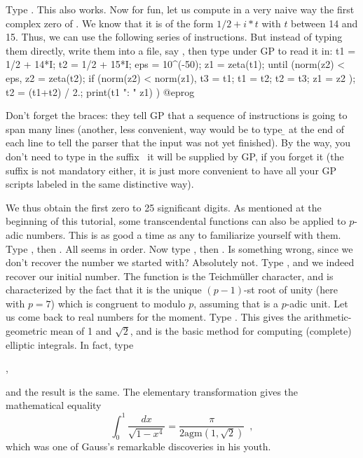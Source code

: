 Type . This also works. Now for fun, let us compute in a
very naive way the first complex zero of . We know that it is
of the form $1/2 + i*t$ with $t$ between 14 and 15. Thus, we can use the
following series of instructions. But instead of typing them directly, write
them into a file, say , then type  under GP to
read it in:
\bprog
{
  t1 = 1/2 + 14*I;
  t2 = 1/2 + 15*I; eps = 10^(-50);
  z1 = zeta(t1);
  until (norm(z2) < eps,
    z2 = zeta(t2);
    if (norm(z2) < norm(z1),
      t3 = t1; t1 = t2; t2 = t3; z1 = z2
    );
    t2 = (t1+t2) / 2.;
    print(t1 ": " z1)
  )
}
@eprog

Don't forget the braces: they tell GP that a sequence of instructions is going
to span many lines (another, less convenient, way would be to type \b{} at the
end of each line to tell the parser that the input was not yet finished).
By the way, you don't need to type in the suffix~ it will be
supplied by GP, if you forget it (the suffix is not mandatory either, it is
just more convenient to have all your GP scripts labeled in the same
distinctive way).

We thus obtain the first zero to 25 significant digits.
\medskip
%
As mentioned at the beginning of this tutorial, some transcendental functions
can also be applied to $p$-adic numbers. This is as good a time as any to
familiarize yourself with them. Type , then
. All seems in order. Now type ,
then . Is something wrong, since we don't recover the number we
started with? Absolutely not. Type
 ,
and we indeed recover our initial number. The function 
is the Teichm\"uller character, and is characterized by the fact that it is
the unique \hbox{$(p-1)$-st} root of unity (here with $p=7$) which is
congruent to  modulo $p$, assuming that  is a $p$-adic
unit.\smallskip
%
Let us come back to real numbers for the moment. Type .
This gives the arithmetic-geometric mean of 1 and $\sqrt2$, and is the basic
method for computing (complete) elliptic integrals. In fact, type

,

\noindent and the result is the same. The elementary transformation
 gives the mathematical equality
$$\int_0^1 \dfrac{dx}{\sqrt{1-x^4}} = \dfrac{\pi}{2\text{agm}(1,\sqrt2)}
\enspace,$$
which was one of Gauss's remarkable discoveries in his youth.

